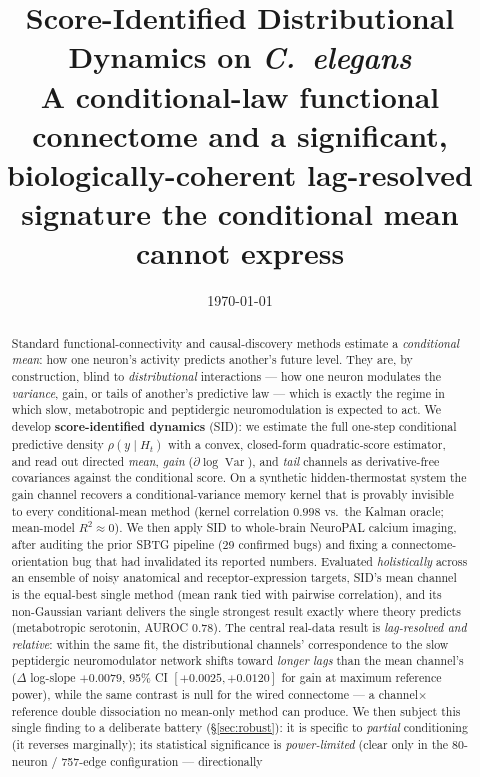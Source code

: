 \documentclass[11pt]{article}
\title{\textbf{Score-Identified Distributional Dynamics on \textit{C.\ elegans}}\\[2pt]
\large A conditional-law functional connectome and a significant, biologically-coherent
lag-resolved signature the conditional mean cannot express}
\author{}
\date{\today}
\newcommand{\Hcal}{H}
\newcommand{\Var}{\operatorname{Var}}
\begin{document}
\maketitle
\vspace{-2.5em}

\begin{abstract}
\noindent
Standard functional-connectivity and causal-discovery methods estimate a \emph{conditional mean}:
how one neuron's activity predicts another's future level. They are, by construction, blind to
\emph{distributional} interactions --- how one neuron modulates the \emph{variance}, gain, or tails
of another's predictive law --- which is exactly the regime in which slow, metabotropic and
peptidergic neuromodulation is expected to act. We develop \textbf{score-identified dynamics}
(SID): we estimate the full one-step conditional predictive density $\rho(y\mid \Hcal_t)$ with a
convex, closed-form quadratic-score estimator, and read out directed \emph{mean}, \emph{gain}
($\partial\log\Var$), and \emph{tail} channels as derivative-free covariances against the
conditional score. On a synthetic hidden-thermostat system the gain channel recovers a
conditional-variance memory kernel that is provably invisible to every conditional-mean method
(kernel correlation $0.998$ vs.\ the Kalman oracle; mean-model $R^2\approx0$). We then apply SID to
whole-brain NeuroPAL calcium imaging, after auditing the prior SBTG pipeline (29 confirmed bugs)
and fixing a connectome-orientation bug that had invalidated its reported numbers. Evaluated
\emph{holistically} across an ensemble of noisy anatomical and receptor-expression targets, SID's
mean channel is the equal-best single method (mean rank tied with pairwise correlation), and its
non-Gaussian variant delivers the single strongest result exactly where theory predicts
(metabotropic serotonin, AUROC $0.78$). The central real-data result is \emph{lag-resolved and
relative}: within the same fit, the distributional channels' correspondence to the slow peptidergic
neuromodulator network shifts toward \emph{longer lags} than the mean channel's ($\Delta$ log-slope
$+0.0079$, 95\% CI $[+0.0025,+0.0120]$ for gain at maximum reference power), while the same contrast
is null for the wired connectome --- a channel$\times$reference double dissociation no mean-only
method can produce. We then subject this single finding to a deliberate battery (\S\ref{sec:robust}):
it is specific to \emph{partial} conditioning (it reverses marginally); its statistical significance
is \emph{power-limited} (clear only in the 80-neuron / 757-edge configuration --- directionally

\end{abstract}
\end{document}
